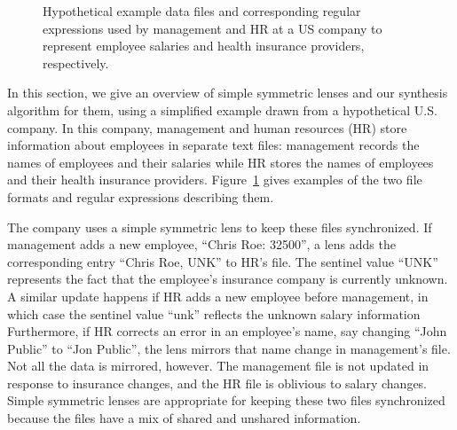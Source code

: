 \documentclass[acmsmall,screen,anonymous]{acmart}
\begin{document}
\begin{figure}
  \centering
  \caption{Hypothetical example data files and corresponding regular expressions
  used by management and HR at a US company to represent employee salaries and health
  insurance providers, respectively.  }  
  \label{fig:minimized-representations}
\end{figure}

In this section, we give an overview of simple symmetric lenses and our
synthesis algorithm for them, using a simplified example drawn from a hypothetical
U.S. company. In this company, management and human resources (HR) store
information about employees in separate text files: management records the
names of 
employees and their salaries while HR stores the names of employees and their
health insurance providers. Figure~\ref{fig:minimized-representations} gives
examples of the two file formats and regular expressions describing them. 

The company uses a simple symmetric lens to keep these files
synchronized. If management adds a new employee, ``Chris Roe: 32500'', a lens
adds the corresponding entry ``Chris Roe, UNK'' to HR's file. The sentinel value
``UNK'' represents the fact that the employee's insurance company is currently
unknown. A similar update happens if HR adds a new employee before management,
in which case the sentinel value ``unk'' reflects the unknown salary information
Furthermore, if HR corrects an error in an employee's name, say changing ``John
Public'' to ``Jon Public'', the lens mirrors that name change in management's
file. Not all the data is mirrored, however. The management file is not updated
in response to insurance changes, and the HR file is oblivious to salary
changes. Simple symmetric lenses are appropriate for keeping these two files
synchronized because the files have a mix of shared and unshared information.
\end{document}
